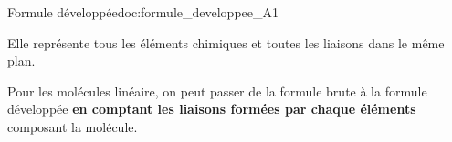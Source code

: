 

\newpage
\vspace*{-40pt}

\vspace*{-8pt}
\begin{doc}{Formule développée}{doc:formule_developpee_A1}
  \begin{importants}  
    Elle représente tous les éléments chimiques et toutes les liaisons dans le même plan.
  \end{importants}

  \exemples
  \vspace*{-18pt}
  \begin{center}
    \qq{}
    \qq{}
  \end{center}
\end{doc}

Pour les molécules linéaire, on peut passer de la formule brute à la formule développée \textbf{en comptant les liaisons formées par chaque éléments} composant la molécule.


